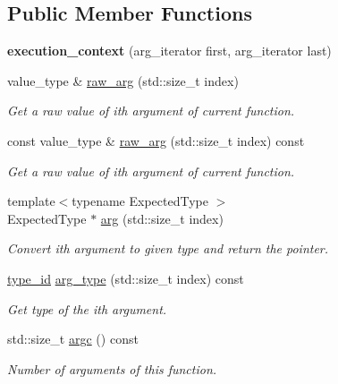 \subsection*{Public Member Functions}
\begin{DoxyCompactItemize}
\item 
\mbox{\label{classdice_1_1execution__context_aa42152a894a78f6b957b96fd69c3922d}} 
{\bfseries execution\+\_\+context} (arg\+\_\+iterator first, arg\+\_\+iterator last)
\item 
value\+\_\+type \& \mbox{\hyperlink{classdice_1_1execution__context_a1e5286fd9fec95590f2162699fe139ef}{raw\+\_\+arg}} (std\+::size\+\_\+t index)
\begin{DoxyCompactList}\small\item\em Get a raw value of ith argument of current function. \end{DoxyCompactList}\item 
const value\+\_\+type \& \mbox{\hyperlink{classdice_1_1execution__context_ac99b80fdabc62175ee5eb54968762631}{raw\+\_\+arg}} (std\+::size\+\_\+t index) const
\begin{DoxyCompactList}\small\item\em Get a raw value of ith argument of current function. \end{DoxyCompactList}\item 
{\footnotesize template$<$typename Expected\+Type $>$ }\\Expected\+Type $\ast$ \mbox{\hyperlink{classdice_1_1execution__context_a58d8a206afcc569dd4ac813a3002ac77}{arg}} (std\+::size\+\_\+t index)
\begin{DoxyCompactList}\small\item\em Convert ith argument to given type and return the pointer. \end{DoxyCompactList}\item 
\mbox{\hyperlink{value_8hpp_ab9af7d8ecc381e026ca4d07a745f23eb}{type\+\_\+id}} \mbox{\hyperlink{classdice_1_1execution__context_a346132ca9cc451ddafccca8fe67213ba}{arg\+\_\+type}} (std\+::size\+\_\+t index) const
\begin{DoxyCompactList}\small\item\em Get type of the ith argument. \end{DoxyCompactList}\item 
std\+::size\+\_\+t \mbox{\hyperlink{classdice_1_1execution__context_a1af91def04d331d9564f2519577b4283}{argc}} () const
\begin{DoxyCompactList}\small\item\em Number of arguments of this function. \end{DoxyCompactList}\end{DoxyCompactItemize}


